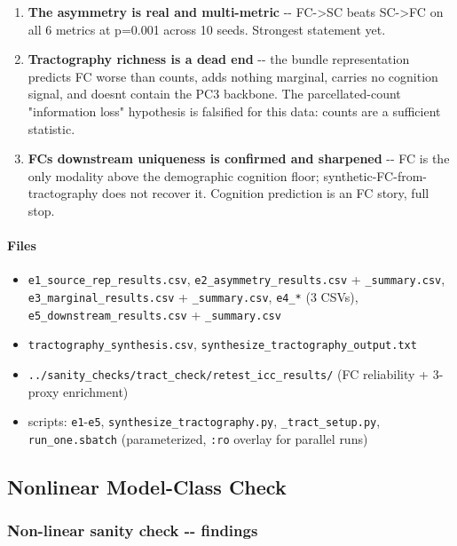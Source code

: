 \begin{enumerate}
\def\labelenumi{\arabic{enumi}.}
\tightlist
\item
  \textbf{The asymmetry is real and multi-metric} -\/- FC-\textgreater SC beats SC-\textgreater FC on all 6 metrics at p=0.001 across 10 seeds. Strongest statement yet.
\item
  \textbf{Tractography richness is a dead end} -\/- the bundle representation predicts FC worse than counts, adds nothing marginal, carries no cognition signal, and doesn\textquotesingle t contain the PC3 backbone. The parcellated-count "information loss" hypothesis is falsified for this data: counts are a sufficient statistic.
\item
  \textbf{FC\textquotesingle s downstream uniqueness is confirmed and sharpened} -\/- FC is the only modality above the demographic cognition floor; synthetic-FC-from-tractography does not recover it. Cognition prediction is an FC story, full stop.
\end{enumerate}

\paragraph{Files}\label{files-2}

\begin{itemize}
\tightlist
\item
  \texttt{e1\_source\_rep\_results.csv}, \texttt{e2\_asymmetry\_results.csv} + \texttt{\_summary.csv}, \texttt{e3\_marginal\_results.csv} + \texttt{\_summary.csv}, \texttt{e4\_*} (3 CSVs), \texttt{e5\_downstream\_results.csv} + \texttt{\_summary.csv}
\item
  \texttt{tractography\_synthesis.csv}, \texttt{synthesize\_tractography\_output.txt}
\item
  \texttt{../sanity\_checks/tract\_check/retest\_icc\_results/} (FC reliability + 3-proxy enrichment)
\item
  scripts: \texttt{e1}-\texttt{e5}, \texttt{synthesize\_tractography.py}, \texttt{\_tract\_setup.py}, \texttt{run\_one.sbatch} (parameterized, \texttt{:ro} overlay for parallel runs)
\end{itemize}

\subsection{Nonlinear Model-Class Check}\label{nonlinear-model-class-check}

\subsubsection{Non-linear sanity check -\/- findings}\label{non-linear-sanity-check----findings}


